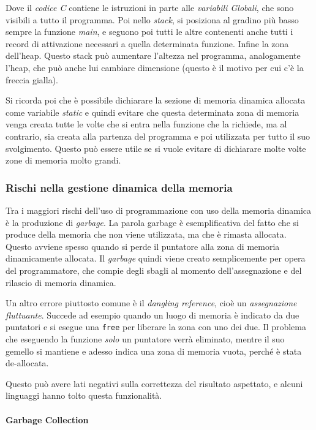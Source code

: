 \documentclass[
]{article}
\begin{document}
Dove il \emph{codice C} contiene le istruzioni in parte alle
\emph{variabili Globali}, che sono visibili a tutto il programma. Poi
nello \emph{stack}, si posiziona al gradino più basso sempre la funzione
\emph{main}, e seguono poi tutti le altre contenenti anche tutti i
record di attivazione necessari a quella determinata funzione. Infine la
zona dell'heap. Questo stack può aumentare l'altezza nel programma,
analogamente l'heap, che può anche lui cambiare dimensione (questo è il
motivo per cui c'è la freccia gialla).

Si ricorda poi che è possibile dichiarare la sezione di memoria dinamica
allocata come variabile \emph{static} e quindi evitare che questa
determinata zona di memoria venga creata tutte le volte che si entra
nella funzione che la richiede, ma al contrario, sia creata alla
partenza del programma e poi utilizzata per tutto il suo svolgimento.
Questo può essere utile se si vuole evitare di dichiarare molte volte
zone di memoria molto grandi.

\hypertarget{header-n1134}{%
\subsubsection{Rischi nella gestione dinamica della
memoria}\label{header-n1134}}

Tra i maggiori rischi dell'uso di programmazione con uso della memoria
dinamica è la produzione di \emph{garbage}. La parola garbage è
esemplificativa del fatto che si produce della memoria che non viene
utilizzata, ma che è rimasta allocata. Questo avviene spesso quando si
perde il puntatore alla zona di memoria dinamicamente allocata. Il
\emph{garbage} quindi viene creato semplicemente per opera del
programmatore, che compie degli sbagli al momento dell'assegnazione e
del rilascio di memoria dinamica.

Un altro errore piuttosto comune è il \emph{dangling reference}, cioè un
\emph{assegnazione fluttuante}. Succede ad esempio quando un luogo di
memoria è indicato da due puntatori e si esegue una \texttt{free} per
liberare la zona con uno dei due. Il problema che eseguendo la funzione
\emph{solo} un puntatore verrà eliminato, mentre il suo gemello si
mantiene e adesso indica una zona di memoria vuota, perché è stata
de-allocata.

Questo può avere lati negativi sulla correttezza del risultato
aspettato, e alcuni linguaggi hanno tolto questa funzionalità.

\hypertarget{header-n1139}{%
\paragraph{Garbage Collection}\label{header-n1139}}
\end{document}
